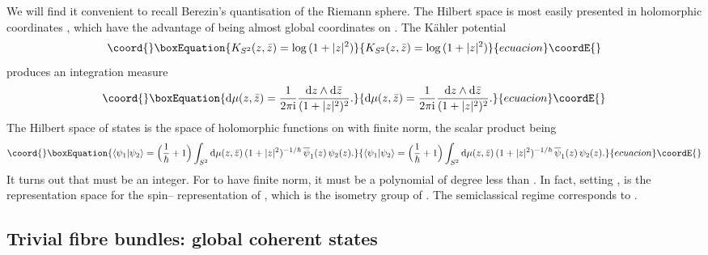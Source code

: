 \documentclass[a4paper,a4paper]{article}
\begin{document}
We will find it convenient to recall Berezin's quantisation 
\cite{BEREZIN} of the Riemann sphere. The Hilbert space is most easily presented 
in holomorphic coordinates \coordHE{}, which have the advantage of being almost 
global coordinates on  \coordHE{}. The K\"ahler potential 
\begin{equation}\coord{}\boxEquation{
K_{S^2}(z,\bar z)={\rm log}\,(1+|z|^2)
\label{sphpot}
}{
K_{S^2}(z,\bar z)={\rm log}\,(1+|z|^2)
}{ecuacion}\coordE{}\end{equation}
produces an integration measure 
\begin{equation}\coord{}\boxEquation{
{\rm d}\mu(z,\bar z)={1\over 2\pi {\rm i}}{{\rm d} z\wedge {\rm d}\bar z\over (1+|z|^2)^2}.
\label{sphmea}
}{
{\rm d}\mu(z,\bar z)={1\over 2\pi {\rm i}}{{\rm d} z\wedge {\rm d}\bar z\over (1+|z|^2)^2}.
}{ecuacion}\coordE{}\end{equation}
The Hilbert space of states is the space \coordHE{} of holomorphic functions on
\coordHE{} with finite norm, the scalar product being
\begin{equation}\coord{}\boxEquation{
\langle\psi_1|\psi_2\rangle =\Big({1\over \hbar} +1\Big)\int_{S^2}{\rm d}\mu(z,\bar
z)\,(1+|z|^2)^{-1/\hbar}\,{\overline
\psi_1(z)}\,\psi_2(z).
\label{sphscalar}
}{
\langle\psi_1|\psi_2\rangle =\Big({1\over \hbar} +1\Big)\int_{S^2}{\rm d}\mu(z,\bar
z)\,(1+|z|^2)^{-1/\hbar}\,{\overline
\psi_1(z)}\,\psi_2(z).
}{ecuacion}\coordE{}\end{equation} 
It turns out that \coordHE{} must be an integer. For \myHighlight{$\psi$}\coordHE{} to have finite
norm, it must be a polynomial of degree less than \coordHE{}. In fact, setting \coordHE{}, 
\coordHE{} is the representation space for the spin--\coordHE{} representation of \coordHE{},
which is the isometry group of \coordHE{}. 
The semiclassical regime corresponds to \coordHE{}. 

\subsection{Trivial fibre bundles: global coherent states}\label{triexam}
\end{document}
